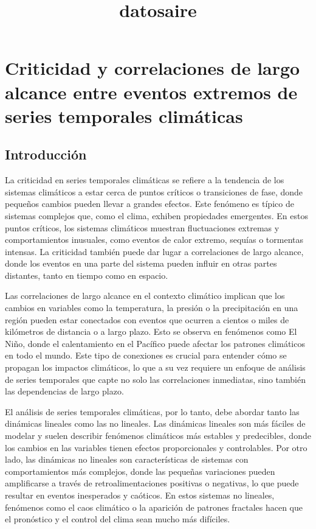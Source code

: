 \documentclass[11pt]{article}
\title{datosaire}
\begin{document}
    
    \maketitle
    
    

    
    \hypertarget{criticidad-y-correlaciones-de-largo-alcance-entre-eventos-extremos-de-series-temporales-climuxe1ticas}{%
\section{Criticidad y correlaciones de largo alcance entre eventos
extremos de series temporales
climáticas}\label{criticidad-y-correlaciones-de-largo-alcance-entre-eventos-extremos-de-series-temporales-climuxe1ticas}}

    \hypertarget{introducciuxf3n}{%
\subsection{Introducción}\label{introducciuxf3n}}

    La criticidad en series temporales climáticas se refiere a la tendencia
de los sistemas climáticos a estar cerca de puntos críticos o
transiciones de fase, donde pequeños cambios pueden llevar a grandes
efectos. Este fenómeno es típico de sistemas complejos que, como el
clima, exhiben propiedades emergentes. En estos puntos críticos, los
sistemas climáticos muestran fluctuaciones extremas y comportamientos
inusuales, como eventos de calor extremo, sequías o tormentas intensas.
La criticidad también puede dar lugar a correlaciones de largo alcance,
donde los eventos en una parte del sistema pueden influir en otras
partes distantes, tanto en tiempo como en espacio.

Las correlaciones de largo alcance en el contexto climático implican que
los cambios en variables como la temperatura, la presión o la
precipitación en una región pueden estar conectados con eventos que
ocurren a cientos o miles de kilómetros de distancia o a largo plazo.
Esto se observa en fenómenos como El Niño, donde el calentamiento en el
Pacífico puede afectar los patrones climáticos en todo el mundo. Este
tipo de conexiones es crucial para entender cómo se propagan los
impactos climáticos, lo que a su vez requiere un enfoque de análisis de
series temporales que capte no solo las correlaciones inmediatas, sino
también las dependencias de largo plazo.

El análisis de series temporales climáticas, por lo tanto, debe abordar
tanto las dinámicas lineales como las no lineales. Las dinámicas
lineales son más fáciles de modelar y suelen describir fenómenos
climáticos más estables y predecibles, donde los cambios en las
variables tienen efectos proporcionales y controlables. Por otro lado,
las dinámicas no lineales son características de sistemas con
comportamientos más complejos, donde las pequeñas variaciones pueden
amplificarse a través de retroalimentaciones positivas o negativas, lo
que puede resultar en eventos inesperados y caóticos. En estos sistemas
no lineales, fenómenos como el caos climático o la aparición de patrones
fractales hacen que el pronóstico y el control del clima sean mucho más
difíciles.
\end{document}
